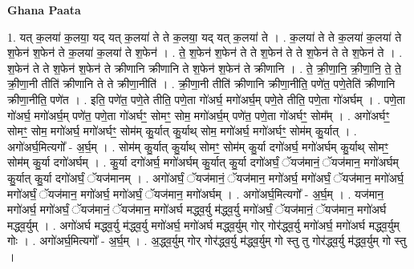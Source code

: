 \documentclass[17pt]{extarticle}
\begin{document}
\textbf{Ghana Paata } \newline

1. यत् क॒लया॑ क॒लया॒ यद् यत् क॒लया॑ ते ते क॒लया॒ यद् यत् क॒लया॑ ते । . क॒लया॑ ते ते क॒लया॑ क॒लया॑ ते श॒फेन॑ श॒फेन॑ ते क॒लया॑ क॒लया॑ ते श॒फेन॑ । . ते॒ श॒फेन॑ श॒फेन॑ ते ते श॒फेन॑ ते ते श॒फेन॑ ते ते श॒फेन॑ ते । . श॒फेन॑ ते ते श॒फेन॑ श॒फेन॑ ते क्रीणानि क्रीणानि ते श॒फेन॑ श॒फेन॑ ते क्रीणानि । . ते॒ क्री॒णा॒नि॒ क्री॒णा॒नि॒ ते॒ ते॒ क्री॒णा॒नी तीति॑ क्रीणानि ते ते क्रीणा॒नीति॑ । . क्री॒णा॒नी तीति॑ क्रीणानि क्रीणा॒नीति॒ पणे॑त॒ पणे॒तेति॑ क्रीणानि क्रीणा॒नीति॒ पणे॑त । . इति॒ पणे॑त॒ पणे॒ते तीति॒ पणे॒ता गो॑अर्घ॒ मगो॑अर्घ॒म् पणे॒ते तीति॒ पणे॒ता गो॑अर्घम् । . पणे॒ता गो॑अर्घ॒ मगो॑अर्घ॒म् पणे॑त॒ पणे॒ता गो॑अर्घꣳ॒॒ सोमꣳ॒॒ सोम॒ मगो॑अर्घ॒म् पणे॑त॒ पणे॒ता गो॑अर्घꣳ॒॒ सोम᳚म् । . अगो॑अर्घꣳ॒॒ सोमꣳ॒॒ सोम॒ मगो॑अर्घ॒ मगो॑अर्घꣳ॒॒ सोम॑म् कु॒र्यात् कु॒र्याथ् सोम॒ मगो॑अर्घ॒ मगो॑अर्घꣳ॒॒ सोम॑म् कु॒र्यात् । . अगो॑अर्घ॒मित्यगो᳚ - अ॒र्घ॒म् । . सोम॑म् कु॒र्यात् कु॒र्याथ् सोमꣳ॒॒ सोम॑म् कु॒र्या दगो॑अर्घ॒ मगो॑अर्घम् कु॒र्याथ् सोमꣳ॒॒ सोम॑म् कु॒र्या दगो॑अर्घम् । . कु॒र्या दगो॑अर्घ॒ मगो॑अर्घम् कु॒र्यात् कु॒र्या दगो॑अर्घं॒ ॅयज॑मानं॒ ॅयज॑मान॒ मगो॑अर्घम् कु॒र्यात् कु॒र्या दगो॑अर्घं॒ ॅयज॑मानम् । . अगो॑अर्घं॒ ॅयज॑मानं॒ ॅयज॑मान॒ मगो॑अर्घ॒ मगो॑अर्घं॒ ॅयज॑मान॒ मगो॑अर्घ॒ मगो॑अर्घं॒ ॅयज॑मान॒ मगो॑अर्घ॒ मगो॑अर्घं॒ ॅयज॑मान॒ मगो॑अर्घम् । . अगो॑अर्घ॒मित्यगो᳚ - अ॒र्घ॒म् । . यज॑मान॒ मगो॑अर्घ॒ मगो॑अर्घं॒ ॅयज॑मानं॒ ॅयज॑मान॒ मगो॑अर्घ मद्ध्व॒र्यु म॑द्ध्व॒र्यु मगो॑अर्घं॒ ॅयज॑मानं॒ ॅयज॑मान॒ मगो॑अर्घ मद्ध्व॒र्युम् । . अगो॑अर्घ मद्ध्व॒र्यु म॑द्ध्व॒र्यु मगो॑अर्घ॒ मगो॑अर्घ मद्ध्व॒र्युम् गोर् गोर॑द्ध्व॒र्यु मगो॑अर्घ॒ मगो॑अर्घ मद्ध्व॒र्युम् गोः । . अगो॑अर्घ॒मित्यगो᳚ - अ॒र्घ॒म् । . अ॒द्ध्व॒र्युम् गोर् गोर॑द्ध्व॒र्यु म॑द्ध्व॒र्युम् गो स्तु तु गोर॑द्ध्व॒र्यु म॑द्ध्व॒र्युम् गो स्तु । \newline
\end{document}
